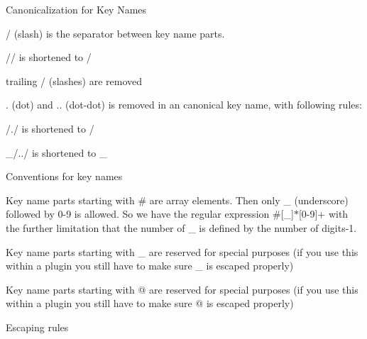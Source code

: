\begin{DoxyItemize}
\begin{DoxyParagraph}{Canonicalization for Key Names}
\begin{DoxyItemize}
\item / (slash) is the separator between key name parts.
\item // is shortened to /
\item trailing / (slashes) are removed
\item . (dot) and .. (dot-\/dot) is removed in an canonical key name, with following rules\+:
\begin{DoxyItemize}
\item /./ is shortened to /
\item \+\_\+/../ is shortened to \+\_\+
\end{DoxyItemize}
\end{DoxyItemize}
\end{DoxyParagraph}
\begin{DoxyParagraph}{Conventions for key names}

\begin{DoxyItemize}
\item Key name parts starting with \# are array elements. Then only \+\_\+ (underscore) followed by 0-\/9 is allowed. So we have the regular expression \#\mbox{[}\+\_\+\mbox{]}$\ast$\mbox{[}0-\/9\mbox{]}+ with the further limitation that the number of \+\_\+ is defined by the number of digits-\/1.
\item Key name parts starting with \+\_\+ are reserved for special purposes (if you use this within a plugin you still have to make sure \+\_\+ is escaped properly)
\item Key name parts starting with @ are reserved for special purposes (if you use this within a plugin you still have to make sure @ is escaped properly)
\end{DoxyItemize}
\end{DoxyParagraph}
\begin{DoxyParagraph}{Escaping rules}


\end{DoxyParagraph}
\end{DoxyItemize}
